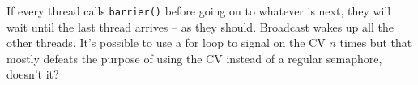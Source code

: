 If every thread calls \texttt{barrier()} before going on to whatever is next, they will wait until the last thread arrives -- as they should. Broadcast wakes up all the other threads. It's possible to use a for loop to signal on the CV $n$ times but that mostly defeats the purpose of using the CV instead of a regular semaphore, doesn't it?



